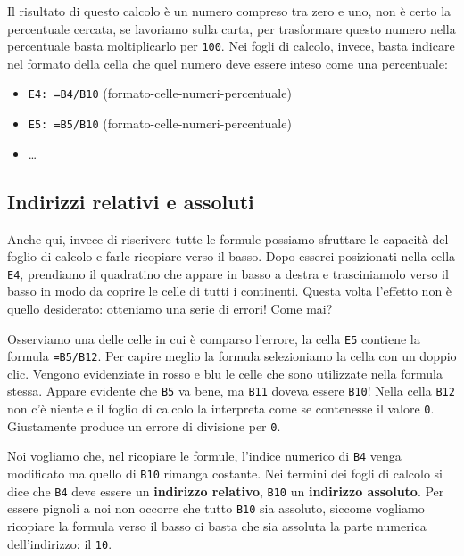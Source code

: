 Il risultato di questo calcolo è un numero compreso tra zero e uno,
non è certo la percentuale cercata,
se lavoriamo sulla carta, per trasformare questo numero nella percentuale
basta moltiplicarlo per \texttt{100}. Nei fogli di calcolo, invece, basta 
indicare nel formato della cella che quel numero deve essere inteso come una 
percentuale:

\begin{itemize} [noitemsep]
\item \texttt{E4: =B4/B10}
(formato-celle-numeri-percentuale)
\item \texttt{E5: =B5/B10}
(formato-celle-numeri-percentuale)
\item \dots
\end{itemize}

\subsection{Indirizzi relativi e assoluti}

Anche qui, invece di riscrivere tutte le formule possiamo sfruttare le
capacità del foglio di calcolo e farle ricopiare verso il basso.
Dopo esserci posizionati nella cella \texttt{E4}, prendiamo il quadratino che
appare in basso a destra e trasciniamolo verso il basso in modo da coprire
le celle di tutti i continenti.
Questa volta l'effetto non è quello desiderato:
otteniamo una serie di errori! Come mai?

Osserviamo una delle celle in cui è comparso l'errore, la cella
\texttt{E5} contiene la formula \texttt{=B5/B12}.
Per capire meglio la formula selezioniamo la cella con un doppio clic.
Vengono evidenziate in rosso e blu le celle che sono utilizzate nella formula
stessa.
Appare evidente che \texttt{B5} va bene, ma \texttt{B11} doveva essere 
\texttt{B10}!
Nella cella \texttt{B12} non c'è niente e il foglio di calcolo la interpreta
come se contenesse il valore \texttt{0}.
Giustamente produce un errore di divisione per \texttt{0}.

Noi vogliamo che, nel ricopiare le formule, l'indice numerico di \texttt{B4} 
venga
modificato ma quello di \texttt{B10} rimanga costante.
Nei termini dei fogli di calcolo si dice che \texttt{B4} deve essere un
\textbf{indirizzo relativo}, \texttt{B10} un \textbf{indirizzo assoluto}.
Per essere pignoli a noi non occorre che tutto \texttt{B10} sia assoluto,
siccome vogliamo ricopiare la formula verso il basso ci basta che sia
assoluta la parte numerica dell'indirizzo: il \texttt{10}.

